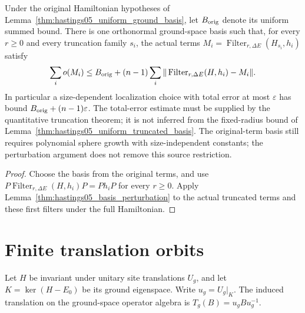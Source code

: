 \begin{lemma}
    \label{thm:hastings05_basis_coupled_radius}
    \leanok
    Under the original Hamiltonian hypotheses of
    Lemma~\ref{thm:hastings05_uniform_ground_basis}, let $B_{\rm orig}$ denote
    its uniform summed bound. There is one orthonormal ground-space basis such
    that, for every $r\ge0$ and every truncation family $s_i$, the actual terms
    $M_i=\operatorname{Filter}_{r,\Delta E}(H_{s_i},h_i)$ satisfy
    \begin{align*}
        \sum_i o(M_i)\le B_{\rm orig}+(n-1)\sum_i
        \|\operatorname{Filter}_{r,\Delta E}(H,h_i)-M_i\|.
    \end{align*}
    In particular a size-dependent localization choice with total error at most
    $\varepsilon$ has bound $B_{\rm orig}+(n-1)\varepsilon$. The total-error
    estimate must be supplied by the quantitative truncation theorem; it is
    not inferred from the fixed-radius bound of
    Lemma~\ref{thm:hastings05_uniform_truncated_basis}. The original-term
    basis still requires polynomial sphere growth with size-independent
    constants; the perturbation argument does not remove this source
    restriction\cite{gap:hastings05_geometric_growth_scope}.
\end{lemma}
\begin{proof}\leanok
    Choose the basis from the original terms, and use
    $P\operatorname{Filter}_{r,\Delta E}(H,h_i)P=Ph_iP$ for every $r\ge0$.
    Apply Lemma~\ref{thm:hastings05_basis_perturbation} to the actual truncated
    terms and these first filters under the full Hamiltonian.
\end{proof}

\section{Finite translation orbits}
\label{sec:translations_finite_orbit}

\begin{definition}
    \label{def:hastings_ground_translation}
    \leanok
    Let $H$ be invariant under unitary site translations $U_g$, and let
    $K=\ker(H-E_0)$ be its ground eigenspace. Write $u_g=U_g|_K$.
    The induced translation on the ground-space operator algebra is
    $T_g(B)=u_gBu_g^{-1}$.
\end{definition}

